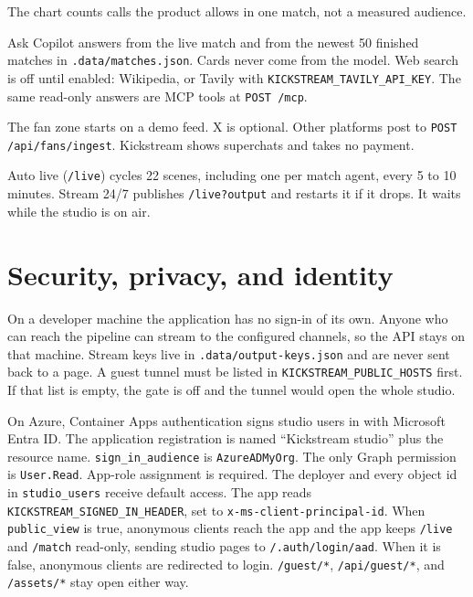 \documentclass[11pt]{article}
\begin{document}
The chart counts calls the product allows in one match, not a measured audience.

\begin{center}
\end{center}

Ask Copilot answers from the live match and from the newest 50 finished matches
in \texttt{.data/matches.json}.
Cards never come from the model.
Web search is off until enabled: Wikipedia, or Tavily with \texttt{KICKSTREAM\_TAVILY\_API\_KEY}.
The same read-only answers are MCP tools at \texttt{POST /mcp}.

The fan zone starts on a demo feed.
X is optional.
Other platforms post to \texttt{POST /api/fans/ingest}.
Kickstream shows superchats and takes no payment.

Auto live (\texttt{/live}) cycles 22 scenes, including one per match agent, every
5 to 10 minutes.
Stream 24/7 publishes \texttt{/live?output} and restarts it if it drops.
It waits while the studio is on air.

\section{Security, privacy, and identity}

On a developer machine the application has no sign-in of its own.
Anyone who can reach the pipeline can stream to the configured channels, so the
API stays on that machine.
Stream keys live in \texttt{.data/output-keys.json} and are never sent back to a page.
A guest tunnel must be listed in \texttt{KICKSTREAM\_PUBLIC\_HOSTS} first.
If that list is empty, the gate is off and the tunnel would open the whole studio.

On Azure, Container Apps authentication signs studio users in with Microsoft Entra ID.
The application registration is named ``Kickstream studio'' plus the resource name.
\texttt{sign\_in\_audience} is \texttt{AzureADMyOrg}.
The only Graph permission is \texttt{User.Read}.
App-role assignment is required.
The deployer and every object id in \texttt{studio\_users} receive default access.
The app reads \texttt{KICKSTREAM\_SIGNED\_IN\_HEADER}, set to \texttt{x-ms-client-principal-id}.
When \texttt{public\_view} is true, anonymous clients reach the app and the app
keeps \texttt{/live} and \texttt{/match} read-only, sending studio pages to
\texttt{/.auth/login/aad}.
When it is false, anonymous clients are redirected to login.
\texttt{/guest/*}, \texttt{/api/guest/*}, and \texttt{/assets/*} stay open either way.
\end{document}
